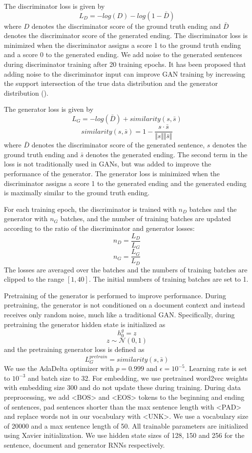 \documentclass{article}
\begin{document}
The discriminator loss is given by
$$ L_{D} = -log(D) - log(1-\bar{D})$$
where $D$ denotes the discriminator score of the ground truth ending and $\bar{D}$ denotes the discriminator score of the generated ending. The discriminator loss is minimized when the discriminator assigns a score 1 to the ground truth ending and a score 0 to the generated ending.
We add noise to the generated sentences during discriminator training after 20 training epochs. It has been proposed that adding noise to the discriminator input can improve GAN training by increasing the support intersection of the true data distribution and the generator distribution (\cite{2017ariv170104862A}).

The generator loss is given by
$$ L_{G} = -log(\bar{D}) + similarity(s, \bar{s}) $$
$$ similarity(s, \bar{s}) = 1 - \frac{s \cdot \bar{s}}{\Vert s \Vert \Vert \bar{s} \Vert} $$
where $\bar{D}$ denotes the discriminator score of the generated sentence, $s$ denotes the ground truth ending and $\bar{s}$ denotes the generated ending. The second term in the loss is not traditionally used in GANs, but was added to improve the performance of the generator. The generator loss is minimized when the discriminator assigns a score 1 to the generated ending and the generated ending is maximally similar to the ground truth ending.

For each training epoch, the discriminator is trained with $n_{D}$ batches and the generator with $n_{G}$ batches, and the number of training batches are updated according to the ratio of the discriminator and generator losses:
$$ n_{D} = \frac{L_{D}}{L_{G}} $$ 
$$ n_{G} = \frac{L_{G}}{L_{D}} $$
The losses are averaged over the batches and the numbers of training batches are clipped to the range $[1,40]$. The initial numbers of training batches are set to 1.

Pretraining of the generator is performed to improve performance. During pretraining, the generator is not conditioned on a document context and instead receives only random noise, much like a traditional GAN. Specifically, during pretraining the generator hidden state is initialized as
$$ h^{g}_{0} = z $$
$$ z \sim \mathcal{N}(0,1) $$
and the pretraining generator loss is defined as
$$ L_{G}^{pretrain} = similarity(s, \bar{s}) $$
We use the AdaDelta optimizer with $p=0.999$ and $\epsilon=10^{-5}$. Learning rate is set to $10^{-3}$ and batch size to 32. For embedding, we use pretrained word2vec weights with embedding size 300 and do not update these during training. During data preprocessing, we add <BOS> and <EOS> tokens to the beginning and ending of sentences, pad sentences shorter than the max sentence length with <PAD> and replace words not in our vocabulary with <UNK>. We use a vocabulary size of 20000 and a max sentence length of 50. All trainable parameters are initialized using Xavier initialization. We use hidden state sizes of 128, 150 and 256 for the sentence, document and generator RNNs respectively.
\end{document}
